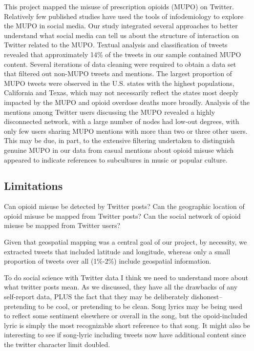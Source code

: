 \documentclass[sigconf]{acmart}
\begin{document}
This project mapped the misuse of prescription opioids (MUPO) on Twitter.
Relatively few published studies have used the tools of infodemiology to explore 
the MUPO in social media. Our study integrated several approaches to better 
understand what social media can tell us about the structure of interaction on 
Twitter related to the MUPO. Textual analysis and classification of tweets 
revealed that approximately 14\% of the tweets in our sample contained MUPO 
content. Several iterations of data cleaning were required to obtain a data set 
that filtered out non-MUPO tweets and mentions. The largest proportion of MUPO 
tweets were observed in the U.S. states with the highest populations, California 
and Texas, which may not necessarily reflect the states most deeply impacted by 
the MUPO and opioid overdose deaths more broadly. Analysis of the mentions among 
Twitter users discussing the MUPO revealed a highly disconnected network, with 
a large number of nodes had low-out degrees, with only few users sharing MUPO 
mentions with more than two or three other users. This may be due, in part, to 
the extensive filtering undertaken to distinguish genuine MUPO in our data from 
casual mentions about opioid misuse which appeared to indicate references to 
subcultures in music or popular culture. 



\subsection{Limitations}
 

Can opioid misuse be detected by Twitter posts?
Can the geographic location of opioid misuse be mapped from Twitter posts? 
Can the social network of opioid misuse be mapped from Twitter users?

 
Given that geospatial mapping was a central goal of our project, by necessity, 
we extracted tweets that included latitude and longitude, whereas only a 
small proportion of tweets over all (1\%-2\%) include geospatial information.
 
 
 
 
To do social science with Twitter data I think we need to understand more about 
what twitter posts mean. As we discussed, they have all the drawbacks of any 
self-report data, PLUS the fact that they may be deliberately dishonest–
pretending to be cool, or pretending to be clean. Song lyrics may be being used 
to reflect some sentiment elsewhere or overall in the song, but the opoid-included 
lyric is simply the most recognizable short reference to that song. It might also 
be interesting to see if song-lyric including tweets now have additional 
content since the twitter character limit doubled.
 
\end{document}
